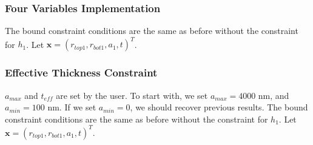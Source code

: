 \documentclass[12pt]{article}
\numberwithin{equation}{section}
\numberwithin{equation}{section}
\begin{document}
%

%
%
%

\subsubsection{Four Variables Implementation}
The bound constraint conditions are the same as before without the constraint for  $h_1$.  Let $\mathbf{x} = \left ( r_{top1}, r_{bot1}, a_1, t  \right )^T $.
\subsubsection{Effective Thickness Constraint}
$a_{max}$ and $t_{eff}$ are set by the user.  To start with, we set $a_{max} = 4000$ nm, and $a_{min} = 100$ nm.  If we set $a_{min} = 0$, we should recover previous results.
The bound constraint conditions are the same as before without the constraint for  $h_1$.  Let $\mathbf{x} = \left ( r_{top1}, r_{bot1}, a_1, t  \right )^T $.
\end{document}
